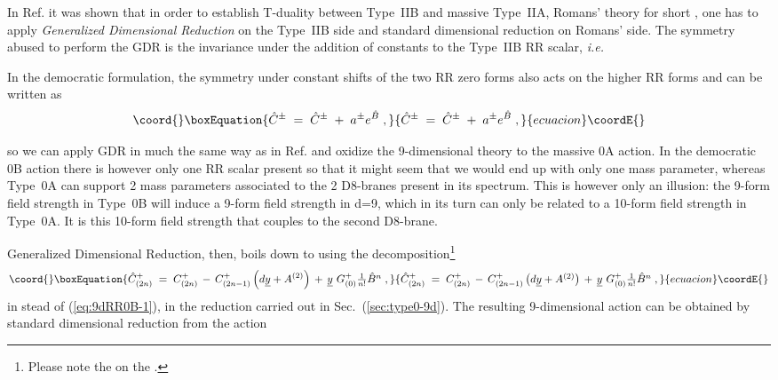 \documentclass[12pt,a4paper]{article}
\begin{document}
In Ref. \cite{kn:BRGPT} it was shown that in order to establish
T-duality between Type~IIB and massive Type~IIA, Romans' theory
for short \cite{kn:Ro2}, one has to apply 
{\em Generalized Dimensional Reduction}
on the Type~IIB side and standard dimensional reduction on Romans' side.
The symmetry abused to perform the GDR is the invariance under
the addition of constants to the Type~IIB RR scalar,
{\em i.e.} \coordHE{} 

In the democratic formulation, the symmetry under constant shifts
of the two RR zero forms also acts on the higher RR forms
and can be written as
\begin{equation}\coord{}\boxEquation{
  \label{eq:shiftsymmetry-2}
  \hat{C}^{\pm}\;=\; \hat{C}^{\pm}\;+\; a^{\pm}e^{\hat{B}} \; ,
}{
  \hat{C}^{\pm}\;=\; \hat{C}^{\pm}\;+\; a^{\pm}e^{\hat{B}} \; ,
}{ecuacion}\coordE{}\end{equation}

so we can apply GDR in much the same way as in Ref. \cite{kn:BRGPT}
and oxidize the 9-dimensional theory to the massive 0A action.
In the democratic 0B action there
is however only one RR scalar present so that it might seem that 
we would end up with only one mass parameter, whereas Type~0A can
support 2 mass parameters associated to the 2 D8-branes present in
its spectrum. This is however only an illusion: the 9-form field strength
in Type~0B will induce a 9-form field strength in d=9, which in its 
turn can only be related to a 10-form field strength in Type~0A. It
is this 10-form field strength that couples to the second D8-brane.

Generalized Dimensional Reduction, then, boils down to using the
decomposition\footnote{Please note the \myHighlight{$\hat{}$}\coordHE{} on the \coordHE{}.}
\begin{equation}\coord{}\boxEquation{
  \label{eq:9dRR0B-mas}
  \hat{C}_{(2n)}^{+}\;=\; C_{(2n)}^{+}\,-\, C^{+}_{(2n-1)}\left(
                                                    d\underline{y}+A^{(2)}
                                                  \right) 
                          \,+\, \underline{y}\  G_{(0)}^{+}
                          \textstyle{\frac{1}{n!}}\hat{B}^{n}\; ,
}{
  \hat{C}_{(2n)}^{+}\;=\; C_{(2n)}^{+}\,-\, C^{+}_{(2n-1)}\left(
                                                    d\underline{y}+A^{(2)}
                                                  \right) 
                          \,+\, \underline{y}\  G_{(0)}^{+}
                          \textstyle{\frac{1}{n!}}\hat{B}^{n}\; ,
}{ecuacion}\coordE{}\end{equation}
in stead of (\ref{eq:9dRR0B-1}), in the 
reduction carried out in Sec.~(\ref{sec:type0-9d}).
The resulting 9-dimensional action can be obtained by standard
dimensional reduction from the action
\end{document}
